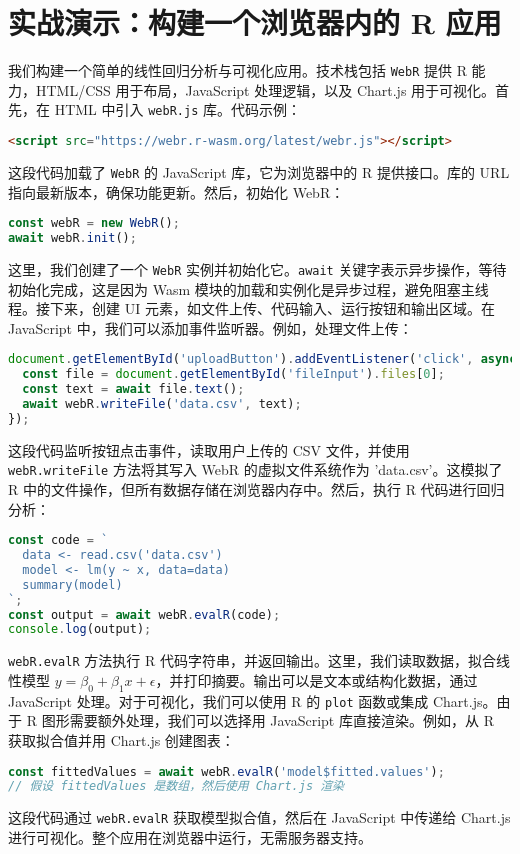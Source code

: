 \chapter{实战演示：构建一个浏览器内的 R 应用}
我们构建一个简单的线性回归分析与可视化应用。技术栈包括 \texttt{WebR} 提供 R 能力，HTML/CSS 用于布局，JavaScript 处理逻辑，以及 Chart.js 用于可视化。首先，在 HTML 中引入 \texttt{webR.js} 库。代码示例：\par
\begin{lstlisting}[language=html]
<script src="https://webr.r-wasm.org/latest/webr.js"></script>
\end{lstlisting}
这段代码加载了 \texttt{WebR} 的 JavaScript 库，它为浏览器中的 R 提供接口。库的 URL 指向最新版本，确保功能更新。然后，初始化 WebR：\par
\begin{lstlisting}[language=javascript]
const webR = new WebR();
await webR.init();
\end{lstlisting}
这里，我们创建了一个 \texttt{WebR} 实例并初始化它。\texttt{await} 关键字表示异步操作，等待初始化完成，这是因为 Wasm 模块的加载和实例化是异步过程，避免阻塞主线程。接下来，创建 UI 元素，如文件上传、代码输入、运行按钮和输出区域。在 JavaScript 中，我们可以添加事件监听器。例如，处理文件上传：\par
\begin{lstlisting}[language=javascript]
document.getElementById('uploadButton').addEventListener('click', async () => {
  const file = document.getElementById('fileInput').files[0];
  const text = await file.text();
  await webR.writeFile('data.csv', text);
});
\end{lstlisting}
这段代码监听按钮点击事件，读取用户上传的 CSV 文件，并使用 \texttt{webR.writeFile} 方法将其写入 WebR 的虚拟文件系统作为 'data.csv'。这模拟了 R 中的文件操作，但所有数据存储在浏览器内存中。然后，执行 R 代码进行回归分析：\par
\begin{lstlisting}[language=javascript]
const code = `
  data <- read.csv('data.csv')
  model <- lm(y ~ x, data=data)
  summary(model)
`;
const output = await webR.evalR(code);
console.log(output);
\end{lstlisting}
\texttt{webR.evalR} 方法执行 R 代码字符串，并返回输出。这里，我们读取数据，拟合线性模型 $y = \beta_0 + \beta_1 x + \epsilon$，并打印摘要。输出可以是文本或结构化数据，通过 JavaScript 处理。对于可视化，我们可以使用 R 的 \texttt{plot} 函数或集成 Chart.js。由于 R 图形需要额外处理，我们可以选择用 JavaScript 库直接渲染。例如，从 R 获取拟合值并用 Chart.js 创建图表：\par
\begin{lstlisting}[language=javascript]
const fittedValues = await webR.evalR('model$fitted.values');
// 假设 fittedValues 是数组，然后使用 Chart.js 渲染
\end{lstlisting}
这段代码通过 \texttt{webR.evalR} 获取模型拟合值，然后在 JavaScript 中传递给 Chart.js 进行可视化。整个应用在浏览器中运行，无需服务器支持。\par
